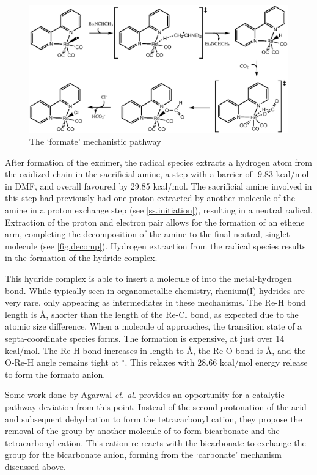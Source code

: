\begin{figure}[!htb]
 \begin{center}
  \includegraphics[clip=true, width=120mm, keepaspectratio]{images/formate.eps}
 \end{center}
\caption{The `formate' mechanistic pathway}
\label{fig.formate}
\end{figure} 

After formation of the excimer, the radical species extracts a hydrogen atom from the oxidized chain in the sacrificial amine, a step with a barrier of -9.83 kcal/mol in DMF, and overall favoured by 29.85 kcal/mol. The sacrificial amine involved in this step had previously had one proton extracted by another molecule of the amine in a proton exchange step (see \autoref{ss.initiation}), resulting in a neutral radical. Extraction of the proton and electron pair allows for the formation of an ethene arm, completing the decomposition of the amine to the final neutral, singlet molecule (see \autoref{fig.decomp}). Hydrogen extraction from the radical species results in the formation of the hydride complex. 

This hydride complex is able to insert a molecule of  into the metal-hydrogen bond. While typically seen in organometallic chemistry, rhenium(I) hydrides are very rare, only appearing as intermediates in these mechanisms. The Re-H bond length is  \r{A}, shorter than the length of the Re-Cl bond, as expected due to the atomic size difference. When a molecule of  approaches, the transition state of a septa-coordinate species forms. The formation is expensive, at just over 14 kcal/mol. The Re-H bond increases in length to \r{A}, the Re-O bond is \r{A}, and the O-Re-H angle remains tight at $^\circ$. This relaxes with 28.66 kcal/mol energy release to form the formato anion. 

Some work done by Agarwal \textit{et. al.} provides an opportunity for a catalytic pathway deviation from this point. Instead of the second protonation of the acid and subsequent dehydration to form the tetracarbonyl cation, they propose the removal of the  group by another molecule of  to form bicarbonate and the tetracarbonyl cation. This cation re-reacts with the bicarbonate to exchange the  group for the bicarbonate anion, forming  from the `carbonate' mechanism discussed above. 

